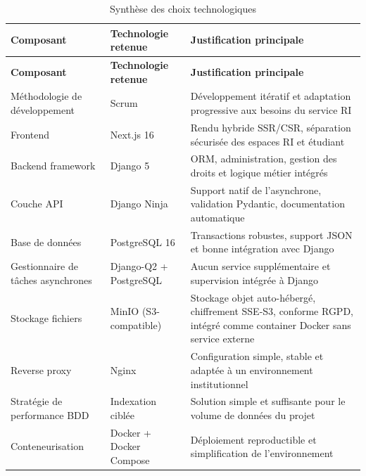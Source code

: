 \begin{longtable}{|p{3cm}|p{3.5cm}|p{8.5cm}|}
\caption{Synthèse des choix technologiques}
\label{tab:synthese-techno} \\
\hline
\rowcolor{gray!20}
\textbf{Composant} & \textbf{Technologie retenue} & \textbf{Justification principale} \\
\hline
\endfirsthead

\hline
\rowcolor{gray!20}
\textbf{Composant} & \textbf{Technologie retenue} & \textbf{Justification principale} \\
\hline
\endhead

Méthodologie de développement & Scrum & Développement itératif et adaptation progressive aux besoins du service RI \\
\hline

Frontend & Next.js 16 & Rendu hybride SSR/CSR, séparation sécurisée des espaces RI et étudiant \\
\hline

Backend framework & Django 5 & ORM, administration, gestion des droits et logique métier intégrés \\
\hline

Couche API & Django Ninja & Support natif de l'asynchrone, validation Pydantic, documentation automatique \\
\hline

Base de données & PostgreSQL 16 & Transactions robustes, support JSON et bonne intégration avec Django \\
\hline

Gestionnaire de tâches asynchrones & Django-Q2 + PostgreSQL & Aucun service supplémentaire et supervision intégrée à Django \\
\hline

Stockage fichiers & MinIO (S3-compatible) & Stockage objet auto-hébergé, chiffrement SSE-S3, conforme RGPD, intégré comme container Docker sans service externe \\
\hline

Reverse proxy & Nginx & Configuration simple, stable et adaptée à un environnement institutionnel \\
\hline

Stratégie de performance BDD & Indexation ciblée & Solution simple et suffisante pour le volume de données du projet \\
\hline

Conteneurisation & Docker + Docker Compose & Déploiement reproductible et simplification de l'environnement \\
\hline


\end{longtable}
